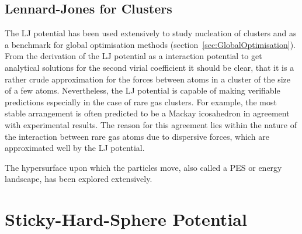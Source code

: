 \subsection{Lennard-Jones for Clusters}
\label{sec:LJClusters}

The \ac{LJ} potential has been used extensively to study nucleation of clusters
and as a benchmark for global optimisation methods
(section~\ref{sec:GlobalOptimisation}). From the derivation of the \ac{LJ}
potential as a interaction potential to get analytical solutions for the second
virial coefficient it should be clear, that it is a rather crude approximation
for the forces between atoms in a cluster of the size of a few atoms.
Nevertheless, the \ac{LJ} potential is capable of making verifiable predictions
especially in the case of rare gas
clusters.\autocite{Wales_Energylandscapes_2003} For example, the most stable
arrangement is often predicted to be a Mackay icosahedron in agreement with
experimental results.\autocite{Kakar_SizedependentKedgeEXAFS_1997} The reason
for this agreement lies within the nature of the interaction between rare gas
atoms due to dispersive forces, which are approximated well by the \ac{LJ}
potential.

The hypersurface upon which the particles move, also called a \ac{PES} or energy landscape, has been explored extensively.\autocite{Doye_Saddlepointsdynamics_2002}

\autocite{Wales_EnergyLandscapesClusters_2000}




\section{Sticky-Hard-Sphere Potential}
\label{sec:SHS}

